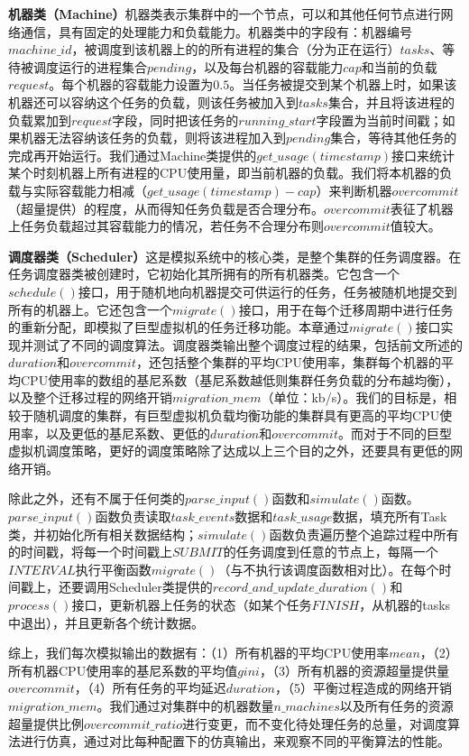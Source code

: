 \noindent\textbf{机器类（Machine）}\quad \label{chap:machine}机器类表示集群中的一个节点，可以和其他任何节点进行网络通信，具有固定的处理能力和负载能力。机器类中的字段有：机器编号$machine\_id$，被调度到该机器上的的所有进程的集合（分为正在运行）$tasks$、等待被调度运行的进程集合$pending$，以及每台机器的容载能力$cap$和当前的负载$request$。每个机器的容载能力设置为$0.5$。当任务被提交到某个机器上时，如果该机器还可以容纳这个任务的负载，则该任务被加入到$tasks$集合，并且将该进程的负载累加到$request$字段，同时把该任务的$running\_start$字段置为当前时间戳；如果机器无法容纳该任务的负载，则将该进程加入到$pending$集合，等待其他任务的完成再开始运行。我们通过Machine类提供的$get\_usage(timestamp)$接口来统计某个时刻机器上所有进程的CPU使用量，即当前机器的负载。我们将本机器的负载与实际容载能力相减（$get\_usage(timestamp) - cap$）来判断机器$overcommit$（超量提供）的程度，从而得知任务负载是否合理分布。$overcommit$表征了机器上任务负载超过其容载能力的情况，若任务不合理分布则$overcommit$值较大。

\noindent\textbf{调度器类（Scheduler）}\quad \label{chap:scheduler}这是模拟系统中的核心类，是整个集群的任务调度器。在任务调度器类被创建时，它初始化其所拥有的所有机器类。它包含一个$schedule()$接口，用于随机地向机器提交可供运行的任务，任务被随机地提交到所有的机器上。它还包含一个$migrate()$接口，用于在每个迁移周期中进行任务的重新分配，即模拟了巨型虚拟机的任务迁移功能。本章通过$migrate()$接口实现并测试了不同的调度算法。调度器类输出整个调度过程的结果，包括前文所述的$duration$和$overcommit$，还包括整个集群的平均CPU使用率，集群每个机器的平均CPU使用率的数组的基尼系数（基尼系数越低则集群任务负载的分布越均衡），以及整个迁移过程的网络开销$migration\_mem$（单位：kb/s）。我们的目标是，相较于随机调度的集群，有巨型虚拟机负载均衡功能的集群具有更高的平均CPU使用率，以及更低的基尼系数、更低的$duration$和$overcommit$。而对于不同的巨型虚拟机调度策略，更好的调度策略除了达成以上三个目的之外，还要具有更低的网络开销。

除此之外，还有不属于任何类的$parse\_input()$函数和$simulate()$函数。$parse\_input()$函数负责读取$task\_events$数据和$task\_usage$数据，填充所有Task类，并初始化所有相关数据结构；$simulate()$函数负责遍历整个追踪过程中所有的时间戳，将每一个时间戳上$SUBMIT$的任务调度到任意的节点上，每隔一个$INTERVAL$执行平衡函数$migrate()$（与不执行该调度函数相对比）。在每个时间戳上，还要调用Scheduler类提供的$record\_and\_update\_duration()$和$process()$接口，更新机器上任务的状态（如某个任务$FINISH$，从机器的tasks中退出），并且更新各个统计数据。

综上，我们每次模拟输出的数据有：（1）所有机器的平均CPU使用率$mean$，（2）所有机器CPU使用率的基尼系数的平均值$gini$，（3）所有机器的资源超量提供量$overcommit$，（4）所有任务的平均延迟$duration$，（5）平衡过程造成的网络开销$migration\_mem$。我们通过对集群中的机器数量$n\_machines$以及所有任务的资源超量提供比例$overcommit\_ratio$进行变更，而不变化待处理任务的总量，对调度算法进行仿真，通过对比每种配置下的仿真输出，来观察不同的平衡算法的性能。

